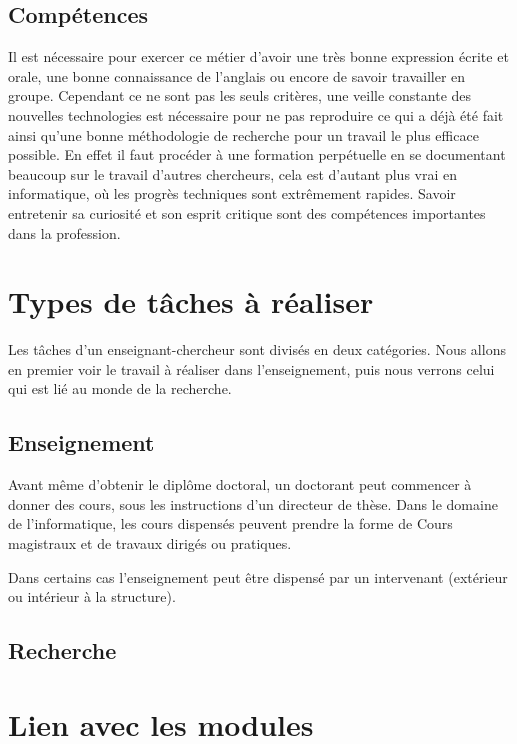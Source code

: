 \documentclass[14pt, a4paper]{report}
\begin{document}
    \subsection{Compétences}

    Il est nécessaire pour exercer ce métier d’avoir une très bonne expression écrite et orale, une bonne connaissance de l’anglais ou encore de savoir travailler en groupe. Cependant ce ne sont pas les seuls critères, une veille constante des nouvelles technologies est nécessaire pour ne pas reproduire ce qui a déjà été fait ainsi qu’une bonne méthodologie de recherche pour un travail le plus efficace possible. En effet il faut procéder à une formation perpétuelle en se documentant beaucoup sur le travail d’autres chercheurs, cela est d’autant plus vrai en informatique, où les progrès techniques sont extrêmement rapides.
    Savoir entretenir sa curiosité et son esprit critique sont des compétences importantes dans la profession.

  \section{Types de tâches à réaliser}

  Les tâches d'un enseignant-chercheur sont divisés en deux catégories. Nous allons en premier voir le travail à réaliser dans l'enseignement, puis nous verrons celui qui est lié au monde de la recherche.

    \subsection{Enseignement}

    Avant même d'obtenir le diplôme doctoral, un doctorant peut commencer à donner des cours, sous les instructions d'un directeur de thèse.
    Dans le domaine de l'informatique, les cours dispensés peuvent prendre la forme de Cours magistraux et de travaux dirigés ou pratiques. 


    Dans certains cas l'enseignement peut être dispensé par un intervenant (extérieur ou intérieur à la structure).

    \subsection{Recherche}

  \section{Lien avec les modules}
\end{document}
